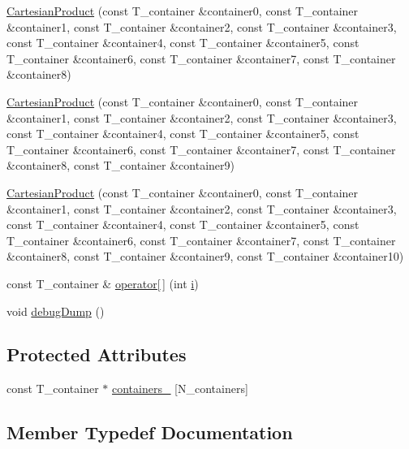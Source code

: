\begin{DoxyCompactItemize}
\item 
\hyperlink{classCartesianProduct_a69e9286c7ceee9e2eb2f2de166da2ec3}{Cartesian\+Product} (const T\+\_\+container \&container0, const T\+\_\+container \&container1, const T\+\_\+container \&container2, const T\+\_\+container \&container3, const T\+\_\+container \&container4, const T\+\_\+container \&container5, const T\+\_\+container \&container6, const T\+\_\+container \&container7, const T\+\_\+container \&container8)
\item 
\hyperlink{classCartesianProduct_aae87bd29f1d92819482b182cd43c9ee1}{Cartesian\+Product} (const T\+\_\+container \&container0, const T\+\_\+container \&container1, const T\+\_\+container \&container2, const T\+\_\+container \&container3, const T\+\_\+container \&container4, const T\+\_\+container \&container5, const T\+\_\+container \&container6, const T\+\_\+container \&container7, const T\+\_\+container \&container8, const T\+\_\+container \&container9)
\item 
\hyperlink{classCartesianProduct_a320343655e43cc79f82f6481f9cc8c32}{Cartesian\+Product} (const T\+\_\+container \&container0, const T\+\_\+container \&container1, const T\+\_\+container \&container2, const T\+\_\+container \&container3, const T\+\_\+container \&container4, const T\+\_\+container \&container5, const T\+\_\+container \&container6, const T\+\_\+container \&container7, const T\+\_\+container \&container8, const T\+\_\+container \&container9, const T\+\_\+container \&container10)
\item 
const T\+\_\+container \& \hyperlink{classCartesianProduct_a3e59bd940a86ee2f1be06e20d6bff849}{operator\mbox{[}$\,$\mbox{]}} (int \hyperlink{indexexpr_8h_aabd77643995707c185e95c8cb2782c81}{i})
\item 
void \hyperlink{classCartesianProduct_a598a71b89b02456fd43954f0e29bf8fd}{debug\+Dump} ()
\end{DoxyCompactItemize}
\subsection*{Protected Attributes}
\begin{DoxyCompactItemize}
\item 
const T\+\_\+container $\ast$ \hyperlink{classCartesianProduct_ac4774e32da9a3fa3dcd50640379f4645}{containers\+\_\+} \mbox{[}N\+\_\+containers\mbox{]}
\end{DoxyCompactItemize}


\subsection{Member Typedef Documentation}
\hypertarget{classCartesianProduct_a4dfd93cd4286d19c22217de7c5518be7}{}
